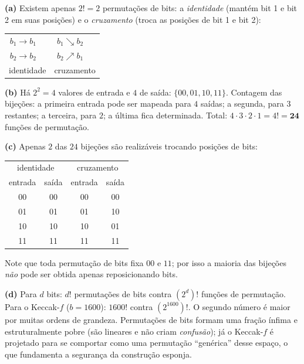 \documentclass[11pt,a4paper]{article}
\newenvironment{resposta}{%
    \begin{respostabox}
    \color{red!70!black}\sloppy
}{%
    \end{respostabox}
}
\begin{document}
\begin{resposta}
\textbf{(a)} Existem apenas $2! = 2$ permuta\c{c}\~{o}es de bits: a \emph{identidade} (mant\'{e}m bit 1 e bit 2 em suas posi\c{c}\~{o}es) e o \emph{cruzamento} (troca as posi\c{c}\~{o}es de bit 1 e bit 2):
\begin{center}
\begin{tabular}{cc@{\qquad\qquad}cc}
$b_1 \longrightarrow b_1$ & & $b_1 \searrow b_2$ &\\[-2pt]
$b_2 \longrightarrow b_2$ & & $b_2 \nearrow b_1$ &\\
\multicolumn{2}{c}{identidade} & \multicolumn{2}{c}{cruzamento}
\end{tabular}
\end{center}

\textbf{(b)} H\'{a} $2^2 = 4$ valores de entrada e $4$ de sa\'{i}da: $\{00, 01, 10, 11\}$. Contagem das bije\c{c}\~{o}es: a primeira entrada pode ser mapeada para $4$ sa\'{i}das; a segunda, para $3$ restantes; a terceira, para $2$; a \'{u}ltima fica determinada. Total: $4 \cdot 3 \cdot 2 \cdot 1 = 4! = \mathbf{24}$ fun\c{c}\~{o}es de permuta\c{c}\~{a}o.

\textbf{(c)} Apenas $2$ das $24$ bije\c{c}\~{o}es s\~{a}o realiz\'{a}veis trocando posi\c{c}\~{o}es de bits:
\begin{center}
\begin{tabular}{c|c@{\qquad\qquad}c|c}
\multicolumn{2}{c}{identidade} & \multicolumn{2}{c}{cruzamento}\\
entrada & sa\'{i}da & entrada & sa\'{i}da\\
\hline
00 & 00 & 00 & 00\\
01 & 01 & 01 & 10\\
10 & 10 & 10 & 01\\
11 & 11 & 11 & 11\\
\end{tabular}
\end{center}
Note que toda permuta\c{c}\~{a}o de bits fixa $00$ e $11$; por isso a maioria das bije\c{c}\~{o}es \emph{n\~{a}o} pode ser obtida apenas reposicionando bits.

\textbf{(d)} Para $d$ bits: $d!$ permuta\c{c}\~{o}es de bits contra $(2^d)!$ fun\c{c}\~{o}es de permuta\c{c}\~{a}o. Para o Keccak-$f$ ($b = 1600$): $1600!$ contra $(2^{1600})!$. O segundo n\'{u}mero \'{e} maior por muitas ordens de grandeza. Permuta\c{c}\~{o}es de bits formam uma fra\c{c}\~{a}o \'{i}nfima e estruturalmente pobre (s\~{a}o lineares e n\~{a}o criam \emph{confus\~{a}o}); j\'{a} o Keccak-$f$ \'{e} projetado para se comportar como uma permuta\c{c}\~{a}o ``gen\'{e}rica'' desse espa\c{c}o, o que fundamenta a seguran\c{c}a da constru\c{c}\~{a}o esponja.
\end{resposta}
\end{document}
